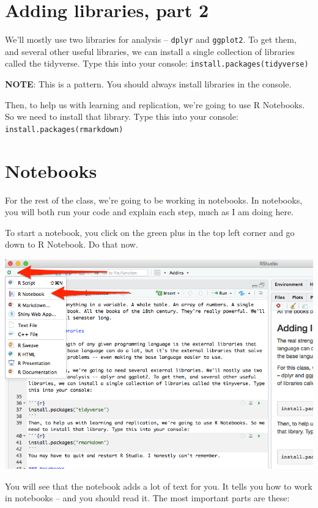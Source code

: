 \documentclass[]{book}
\begin{document}
\section{Adding libraries, part 2}\label{adding-libraries-part-2}

We'll mostly use two libraries for analysis -- \texttt{dplyr} and
\texttt{ggplot2}. To get them, and several other useful libraries, we
can install a single collection of libraries called the tidyverse. Type
this into your console:
\texttt{install.packages(\textquotesingle{}tidyverse\textquotesingle{})}

\textbf{NOTE}: This is a pattern. You should always install libraries in
the console.

Then, to help us with learning and replication, we're going to use R
Notebooks. So we need to install that library. Type this into your
console:
\texttt{install.packages(\textquotesingle{}rmarkdown\textquotesingle{})}

\section{Notebooks}\label{notebooks}

For the rest of the class, we're going to be working in notebooks. In
notebooks, you will both run your code and explain each step, much as I
am doing here.

To start a notebook, you click on the green plus in the top left corner
and go down to R Notebook. Do that now.

\includegraphics[width=11.08in]{images/verybasics2}

You will see that the notebook adds a lot of text for you. It tells you
how to work in notebooks -- and you should read it. The most important
parts are these:
\end{document}
